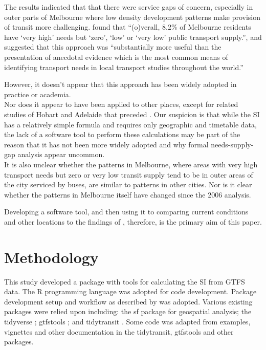 \documentclass[preprint, 3p,
authoryear]{elsarticle} %
\begin{document}
The results indicated that that there were service gaps of concern,
especially in outer parts of Melbourne where low density development
patterns make provision of transit more challenging.
\citet{currie2010identifying} found that ``(o)verall, 8.2\% of Melbourne
residents have `very high' needs but `zero', `low' or `very low' public
transport supply.'', and suggested that this approach was
``substantially more useful than the presentation of anecdotal evidence
which is the most common means of identifying transport needs in local
transport studies throughout the world.''

However, it doesn't appear that this approach has been widely adopted in
practice or academia.\\
Nor does it appear to have been applied to other places, except for
related studies of Hobart and Adelaide that preceded
\citet{currie2010identifying}. Our suspicion is that while the SI has a
relatively simple formula and requires only geographic and timetable
data, the lack of a software tool to perform these calculations may be
part of the reason that it has not been more widely adopted and why
formal needs-supply-gap analysis appear uncommon.\\
It is also unclear whether the patterns in Melbourne, where areas with
very high transport needs but zero or very low transit supply tend to be
in outer areas of the city serviced by buses, are similar to patterns in
other cities. Nor is it clear whether the patterns in Melbourne itself
have changed since the 2006 analysis.

Developing a software tool, and then using it to comparing current
conditions and other locations to the findings of
\citet{currie2010identifying}, therefore, is the primary aim of this
paper.

\hypertarget{methodology}{%
\section{Methodology}\label{methodology}}

This study developed a package with tools for calculating the SI from
GTFS data. The R programming language \citep{R-base} was adopted for
code development. Package development setup and workflow as described by
\citet{wickham2023r} was adopted. Various existing packages were relied
upon including: the sf package \citep{R-sf} for geospatial analysis; the
tidyverse \citep{tidyverse2019}; gtfstools \citep{R-gtfstools}; and
tidytransit \citep{R-tidytransit}. Some code was adapted from examples,
vignettes and other documentation in the tidytransit, gtfstools and
other packages.
\end{document}
